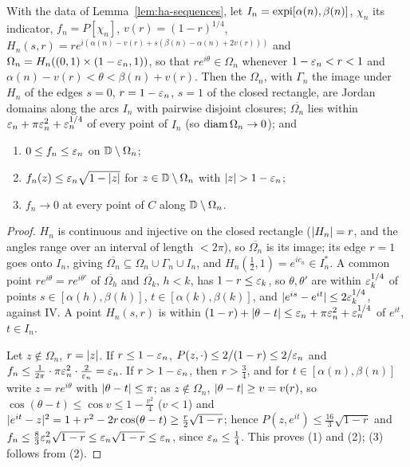 \begin{lemma}[estimates]\label{lem:ha-estimates}
With the data of Lemma~\ref{lem:ha-sequences}, let $I_n=\operatorname{expi}[\alpha(n),\beta(n)]$, $\chi_n$ its indicator, $f_n=P[\chi_n]$,
$v(r)=(1-r)^{1/4}$, $H_n(s,r)=re^{i(\alpha(n)-v(r)+s(\beta(n)-\alpha(n)+2v(r)))}$ and $\Omega_n=H_n((0,1)\times(1-\varepsilon_n,1))$, so that
$re^{i\theta}\in\Omega_n$ whenever $1-\varepsilon_n<r<1$ and $\alpha(n)-v(r)<\theta<\beta(n)+v(r)$. Then the $\Omega_n$, with $\Gamma_n$ the
image under $H_n$ of the edges $s=0$, $r=1-\varepsilon_n$, $s=1$ of the closed rectangle, are Jordan domains along the arcs $I_n$ with pairwise disjoint closures; $\overline{\Omega_n}$ lies within $\varepsilon_n+\pi\varepsilon_n^2+\varepsilon_n^{1/4}$ of every point of $I_n$ (so
$\operatorname{diam}\Omega_n\to0$); and
\begin{enumerate}[label=(\arabic*)]
\item $0\le f_n\le\varepsilon_n$ on $\mathbb{D}\setminus\Omega_n$;
\item $f_n(z)\le\varepsilon_n\sqrt{1-\lvert z\rvert}$ for $z\in\mathbb{D}\setminus\Omega_n$ with $\lvert z\rvert>1-\varepsilon_n$;
\item $f_n\to0$ at every point of $C$ along $\mathbb{D}\setminus\Omega_n$.
\end{enumerate}
\end{lemma}
\begin{proof}
$H_n$ is continuous and injective on the closed rectangle ($\lvert H_n\rvert=r$, and the angles range over an interval of length
$<2\pi$), so $\overline{\Omega_n}$ is its image; its edge $r=1$ goes onto $I_n$, giving $\overline{\Omega_n}\subseteq\Omega_n\cup\Gamma_n\cup I_n$,
and $H_n(\frac12,1)=e^{ic_n}\in I_n^*$. A common point $re^{i\theta}=re^{i\theta'}$ of $\overline{\Omega_h}$ and $\overline{\Omega_k}$, $h<k$,
has $1-r\le\varepsilon_k$, so $\theta,\theta'$ are within $\varepsilon_k^{1/4}$ of points $s\in[\alpha(h),\beta(h)]$, $t\in[\alpha(k),\beta(k)]$, and
$\lvert e^{is}-e^{it}\rvert\le2\varepsilon_k^{1/4}$, against IV. A point $H_n(s,r)$ is within $(1-r)+\lvert \theta-t\rvert\le\varepsilon_n+\pi\varepsilon_n^2+\varepsilon_n^{1/4}$
of $e^{it}$, $t\in I_n$.

Let $z\notin\Omega_n$, $r=\lvert z\rvert$. If $r\le1-\varepsilon_n$, $P(z,\cdot)\le2/(1-r)\le2/\varepsilon_n$ and $f_n\le\frac1{2\pi}\cdot\pi\varepsilon_n^2\cdot\frac2{\varepsilon_n}=\varepsilon_n$.
If $r>1-\varepsilon_n$, then $r>\frac34$, and for $t\in[\alpha(n),\beta(n)]$ write $z=re^{i\theta}$ with $\lvert \theta-t\rvert\le\pi$; as $z\notin\Omega_n$,
$\lvert \theta-t\rvert\ge v=v(r)$, so $\cos(\theta-t)\le\cos v\le1-\frac{v^2}4$ ($v<1$) and
$\lvert e^{it}-z\rvert^2=1+r^2-2r\cos(\theta-t)\ge\frac r2\sqrt{1-r}$; hence $P(z,e^{it})\le\frac{16}3\sqrt{1-r}$ and
$f_n\le\frac83\varepsilon_n^2\sqrt{1-r}\le\varepsilon_n\sqrt{1-r}\le\varepsilon_n$, since $\varepsilon_n\le\frac14$. This proves (1) and (2); (3) follows from (2).
\end{proof}

